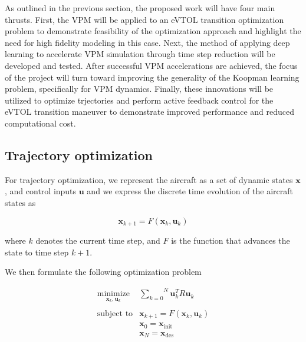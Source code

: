 \documentclass[12pt, letterpaper]{article}
\begin{document}


As outlined in the previous section, the proposed work will have four main thrusts.  First, the VPM will be applied to an eVTOL transition optimization problem to demonstrate feasibility of the optimization approach and highlight the need for high fidelity modeling in this case.  Next, the method of applying deep learning to accelerate VPM simulation through time step reduction will be developed and tested.  After successful VPM accelerations are achieved, the focus of the project will turn toward improving the generality of the Koopman learning problem, specifically for VPM dynamics.  Finally, these innovations will be utilized to optimize trjectories and perform active feedback control for the eVTOL transition maneuver to demonstrate improved performance and reduced computational cost.  

\subsection{Trajectory optimization}

For trajectory optimization, we represent the aircraft as a set of dynamic states $\mathbf{x}$, and control inputs $\mathbf{u}$ and we express the discrete time evolution of the aircraft states as

\begin{equation}
    \mathbf{x}_{k+1} = F(\mathbf{x}_k, \mathbf{u}_k)
\end{equation}

where $k$ denotes the current time step, and $F$ is the function that advances the state to time step $k+1$.

We then formulate the following optimization problem

\begin{equation}
    \begin{matrix}
        \underset{\mathbf{x}_k, \mathbf{u}_k}{\text{minimize}} & \overset{N}{\underset{k=0}{\sum}} \mathbf{u}_k^T R \mathbf{u}_k \\ \\ 
        \text{subject to} & \mathbf{x}_{k+1} = F(\mathbf{x}_k, \mathbf{u}_k) \\
        & \mathbf{x}_0 = \mathbf{x}_{\text{init}} \\ 
        & \mathbf{x}_N = \mathbf{x}_{\text{des}}
    \end{matrix}
\end{equation}
\end{document}
